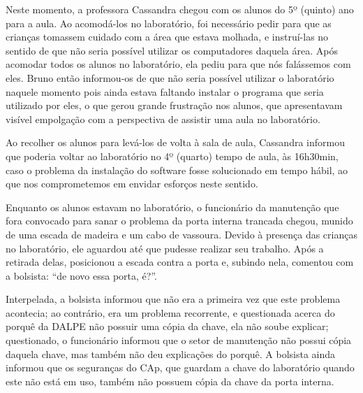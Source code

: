 
Neste momento, a professora Cassandra chegou com os alunos do 5º (quinto) ano para a aula. Ao acomodá-los no laboratório, foi necessário pedir para que as crianças tomassem cuidado com a área que estava molhada, e instruí-las no sentido de que não seria possível utilizar os computadores daquela área. Após acomodar todos os alunos no laboratório, ela pediu para que nós falássemos com eles. Bruno então informou-os de que não seria possível utilizar o laboratório naquele momento pois ainda estava faltando instalar o programa que seria utilizado por eles, o que gerou grande frustração nos alunos, que apresentavam visível empolgação com a perspectiva de assistir uma aula no laboratório.

Ao recolher os alunos para levá-los de volta à sala de aula, Cassandra informou que poderia voltar ao laboratório no 4º (quarto) tempo de aula, às 16h30min, caso o problema da instalação do software fosse solucionado em tempo hábil, ao que nos comprometemos em envidar esforços neste sentido.


Enquanto os alunos estavam no laboratório, o funcionário da manutenção que fora convocado para sanar o problema da porta interna trancada chegou, munido de uma escada de madeira e um cabo de vassoura. Devido à presença das crianças no laboratório, ele aguardou até que pudesse realizar seu trabalho. Após a retirada delas, posicionou a escada contra a porta e, subindo nela, comentou com a bolsista: “de novo essa porta, é?”.

Interpelada, a bolsista informou que não era a primeira vez que este problema acontecia; ao contrário, era um problema recorrente, e questionada acerca do porquê da DALPE não possuir uma cópia da chave, ela não soube explicar; questionado, o funcionário informou que o setor de manutenção não possui cópia daquela chave, mas também não deu explicações do porquê. A bolsista ainda informou que os seguranças do CAp, que guardam a chave do laboratório quando este não está em uso, também não possuem cópia da chave da porta interna.

